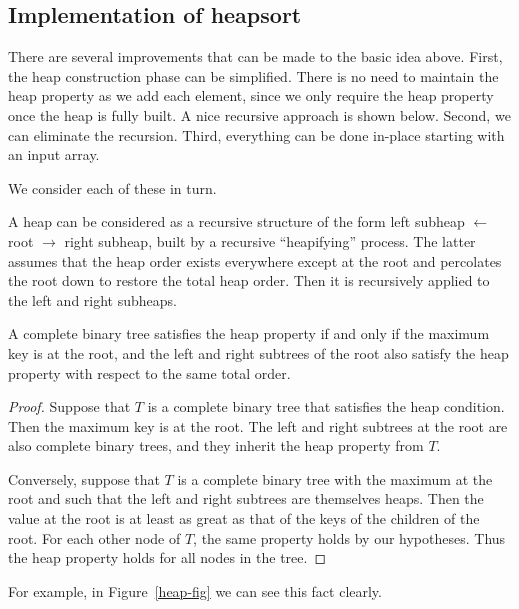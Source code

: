 \subsection*{Implementation of heapsort} 

There are several improvements that can be made to the basic idea above. First, 
the heap construction phase can be simplified. There is no need to maintain the 
heap property as we add each element, since we only require the heap property
once the heap is fully built. A nice recursive approach is shown below. Second, 
 we can eliminate the recursion. Third, everything can be done 
in-place starting with an input array. 

We consider each of these in turn.

A heap can be considered as a recursive structure
of the form \textsf{left subheap} $\leftarrow$ \textsf{root} $\rightarrow$
\textsf{right subheap}, built by a recursive ``heapifying''
process. The latter assumes that the heap order exists everywhere
except at the root and percolates the root down to restore the total
heap order. Then it is recursively applied to the left and right
subheaps. 

\begin{Lemma}
A complete binary tree satisfies the heap property if and only if the maximum 
key is at the root, and the left and right subtrees of the root also satisfy 
the heap property with respect to the same total order.
\end{Lemma}
\begin{proof}
Suppose that $T$ is a complete binary tree that satisfies the heap condition. 
Then the maximum key is at the root. The left and right subtrees at the root 
are also complete binary trees, and they inherit the heap property from $T$. 

Conversely, suppose that $T$ is a complete binary tree with the maximum at the
root and such that the left and right subtrees are themselves heaps. 
Then the value at the root is at least as great as that of the keys of the 
children of the root. For each other node of $T$, the same property holds by our
hypotheses. Thus the heap property holds for all nodes in the tree.
\end{proof}

For example, in Figure~\ref{heap-fig} we can see this fact clearly.
		
